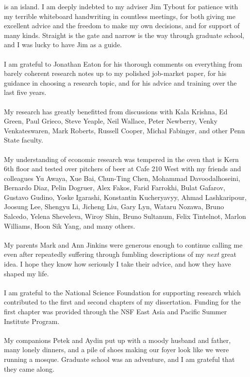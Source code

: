 
 is an island.  I am deeply indebted to my adviser Jim Tybout for patience with my terrible whiteboard handwriting in countless meetings, for both giving me excellent advice and the freedom to make my own decisions, and for support of many kinds.  Straight is the gate and narrow is the way through graduate school, and I was lucky to have Jim as a guide.\\
\vspace{1pt} \\
I am grateful to Jonathan Eaton for his thorough comments on everything from barely coherent research notes up to my polished job-market paper, for his guidance in choosing a research topic, and for his advice and training over the last five years.\\
\vspace{1pt}\\
My research has greatly benefitted from discussions with Kala Krishna, Ed Green, Paul Grieco, Steve Yeaple, Neil Wallace, Peter Newberry, Venky Venkateswaren, Mark Roberts, Russell Cooper, Michal Fabinger, and other Penn State faculty.\\
\vspace{1pt}\\
My understanding of economic research was tempered in the oven that is Kern 6th floor and tested over pitchers of beer at Cafe 210 West with my friends and colleagues Yu Awaya, Xue Bai, Chun-Ting Chen, Mohammad Davoodalhoseini, Bernardo Diaz, Pelin Dogruer, Alex Fakos, Farid Farrokhi, Bulat Gafarov, Gustavo Gudino, Yoske Igarashi, Konstantin Kucheryavyy, Ahmad Lashkaripour, Joosung Lee, Shengyu Li, Jicheng Liu, Gary Lyn, Wataru Nozawa, Bruno Salcedo, Yelena Sheveleva, Wiroy Shin, Bruno Sultanum, Felix Tintelnot, Marlon Williams, Hoon Sik Yang, and many others.\\
\vspace{1pt}\\
My parents Mark and Ann Jinkins were generous enough to continue calling me even after repeatedly suffering through fumbling descriptions of my \emph{next} great idea.  I hope they know how seriously I take their advice, and how they have shaped my life.\\
\vspace{1pt}\\
I am grateful to the National Science Foundation for supporting research which contributed to the first and second chapters of my dissertation.  Funding for the first chapter was provided through the NSF East Asia and Pacific Summer Institute Program.\\
\vspace{1pt}\\
My companions Petek and Aydin put up with a moody husband and father, many lonely dinners, and a pile of shoes making our foyer look like we were running a mosque.  Graduate school was an adventure, and I am grateful that they came along.
